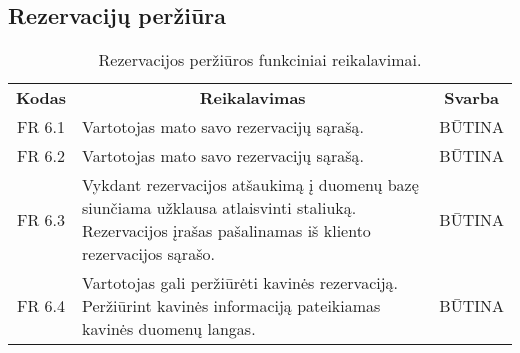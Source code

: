 \documentclass{VUMIFPSkursinis}
\begin{document}
\pagebreak

\subsection{Rezervacijų peržiūra}
\begin{center}
	\begin{table}[H]
	\begin{tabular}{|p{2cm}|p{}|p{}|}
	
	\hline
	    \rowcolor{lightgray}
		\multicolumn{3}{|c|}{Rezervacijų priežiūra}\\
		
	\hline
		\multicolumn{1}{|c|}{{\bfseries Kodas}}&
		\multicolumn{1}{|c|}{{\bfseries Reikalavimas}}&
		\multicolumn{1}{|c|}{{\bfseries Svarba}}\\

	\hline
	
		\multicolumn{1}{|c|}{FR 6.1}&
		{Vartotojas mato savo rezervacijų sąrašą.}&
		\multicolumn{1}{|c|}{BŪTINA}\\				
	\hline
	
		\multicolumn{1}{|c|}{FR 6.2}&
		{Vartotojas mato savo rezervacijų sąrašą.}&
		\multicolumn{1}{|c|}{BŪTINA}\\				
	\hline
	
		\multicolumn{1}{|c|}{FR 6.3}&
		{Vykdant rezervacijos atšaukimą į duomenų bazę siunčiama užklausa atlaisvinti staliuką. Rezervacijos įrašas pašalinamas iš kliento rezervacijos sąrašo.}&
		\multicolumn{1}{|c|}{BŪTINA}\\				
	\hline
	
		\multicolumn{1}{|c|}{FR 6.4}&
		{Vartotojas gali peržiūrėti kavinės rezervaciją. Peržiūrint kavinės informaciją pateikiamas kavinės duomenų langas.}&
		\multicolumn{1}{|c|}{BŪTINA}\\				
	\hline		
	
	\end{tabular}		
	\caption{Rezervacijos peržiūros funkciniai reikalavimai.}
	\label{tabel:RezervacijosPeržiūra}
	\end{table}


\end{center}
\end{document}
